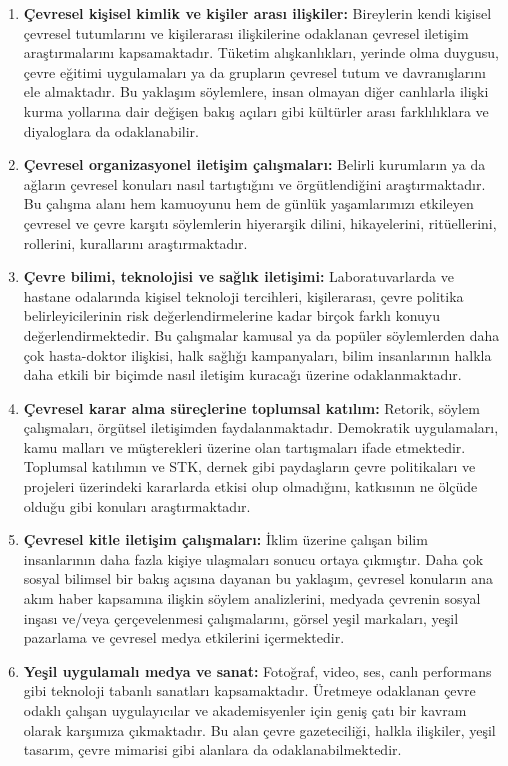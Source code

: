 \documentclass[
]{book}
\begin{document}
\begin{enumerate}
\def\labelenumi{\arabic{enumi}.}
\item
  \textbf{Çevresel kişisel kimlik ve kişiler arası ilişkiler:} Bireylerin kendi kişisel çevresel tutumlarını ve kişilerarası ilişkilerine odaklanan çevresel iletişim araştırmalarını kapsamaktadır. Tüketim alışkanlıkları, yerinde olma duygusu, çevre eğitimi uygulamaları ya da grupların çevresel tutum ve davranışlarını ele almaktadır. Bu yaklaşım söylemlere, insan olmayan diğer canlılarla ilişki kurma yollarına dair değişen bakış açıları gibi kültürler arası farklılıklara ve diyaloglara da odaklanabilir.
\item
  \textbf{Çevresel organizasyonel iletişim çalışmaları:} Belirli kurumların ya da ağların çevresel konuları nasıl tartıştığını ve örgütlendiğini araştırmaktadır. Bu çalışma alanı hem kamuoyunu hem de günlük yaşamlarımızı etkileyen çevresel ve çevre karşıtı söylemlerin hiyerarşik dilini, hikayelerini, ritüellerini, rollerini, kurallarını araştırmaktadır.
\item
  \textbf{Çevre bilimi, teknolojisi ve sağlık iletişimi:} Laboratuvarlarda ve hastane odalarında kişisel teknoloji tercihleri, kişilerarası, çevre politika belirleyicilerinin risk değerlendirmelerine kadar birçok farklı konuyu değerlendirmektedir. Bu çalışmalar kamusal ya da popüler söylemlerden daha çok hasta-doktor ilişkisi, halk sağlığı kampanyaları, bilim insanlarının halkla daha etkili bir biçimde nasıl iletişim kuracağı üzerine odaklanmaktadır.
\item
  \textbf{Çevresel karar alma süreçlerine toplumsal katılım:} Retorik, söylem çalışmaları, örgütsel iletişimden faydalanmaktadır. Demokratik uygulamaları, kamu malları ve müşterekleri üzerine olan tartışmaları ifade etmektedir. Toplumsal katılımın ve STK, dernek gibi paydaşların çevre politikaları ve projeleri üzerindeki kararlarda etkisi olup olmadığını, katkısının ne ölçüde olduğu gibi konuları araştırmaktadır.
\item
  \textbf{Çevresel kitle iletişim çalışmaları:} İklim üzerine çalışan bilim insanlarının daha fazla kişiye ulaşmaları sonucu ortaya çıkmıştır. Daha çok sosyal bilimsel bir bakış açısına dayanan bu yaklaşım, çevresel konuların ana akım haber kapsamına ilişkin söylem analizlerini, medyada çevrenin sosyal inşası ve/veya çerçevelenmesi çalışmalarını, görsel yeşil markaları, yeşil pazarlama ve çevresel medya etkilerini içermektedir.
\item
  \textbf{Yeşil uygulamalı medya ve sanat:} Fotoğraf, video, ses, canlı performans gibi teknoloji tabanlı sanatları kapsamaktadır. Üretmeye odaklanan çevre odaklı çalışan uygulayıcılar ve akademisyenler için geniş çatı bir kavram olarak karşımıza çıkmaktadır. Bu alan çevre gazeteciliği, halkla ilişkiler, yeşil tasarım, çevre mimarisi gibi alanlara da odaklanabilmektedir.

\end{enumerate}
\end{document}
